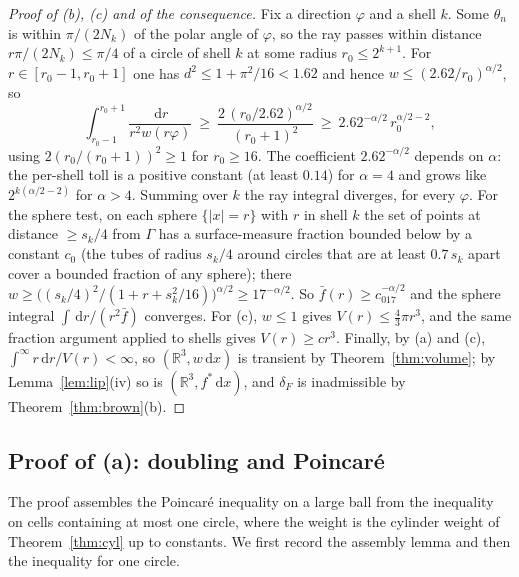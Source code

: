 \documentclass[11pt]{amsart}
\newcommand{\R}{\mathbb{R}}
\newcommand{\dd}{\,\mathrm{d}}
\newcommand{\abs}[1]{\lvert #1\rvert}
\newcommand{\fbar}{\bar f}
\theoremstyle{plain}
\theoremstyle{definition}
\theoremstyle{remark}
\begin{document}
\begin{proof}[Proof of (b), (c) and of the consequence]
Fix a direction $\varphi$ and a shell $k$. Some $\theta_n$ is within
$\pi/(2N_k)$ of the polar angle of $\varphi$, so the ray passes within
distance $r\pi/(2N_k)\le\pi/4$ of a circle of shell $k$ at some radius
$r_0\le2^{k+1}$. For $r\in[r_0-1,r_0+1]$ one has $d^2\le1+\pi^2/16<1.62$ and
hence $w\le(2.62/r_0)^{\alpha/2}$, so
\begin{equation}\label{eq:raybound}
\int_{r_0-1}^{r_0+1}\frac{\dd r}{r^2w(r\varphi)}\ \ge\
\frac{2\,(r_0/2.62)^{\alpha/2}}{(r_0+1)^2}\ \ge\ 2.62^{-\alpha/2}\,r_0^{\alpha/2-2},
\end{equation}
using $2(r_0/(r_0+1))^2\ge1$ for $r_0\ge16$. The coefficient $2.62^{-\alpha/2}$
depends on $\alpha$: the per-shell toll is a positive constant (at least $0.14$)
for $\alpha=4$ and grows like $2^{k(\alpha/2-2)}$ for
$\alpha>4$. Summing over $k$ the ray integral diverges, for every $\varphi$. For
the sphere test, on each sphere $\{\abs x=r\}$ with $r$ in shell $k$ the set of
points at distance $\ge s_k/4$ from $\Gamma$ has a surface-measure fraction
bounded below by a constant $c_0$ (the tubes of radius $s_k/4$ around circles
that are at least $0.7\,s_k$ apart cover a bounded fraction of any sphere);
there $w\ge\bigl((s_k/4)^2/(1+r+s_k^2/16)\bigr)^{\alpha/2}\ge17^{-\alpha/2}$.
So $\fbar(r)\ge c_017^{-\alpha/2}$ and the sphere integral $\int\dd r/(r^2\fbar)$
converges. For (c), $w\le1$ gives $V(r)\le\frac43\pi r^3$, and the same
fraction argument applied to shells gives $V(r)\ge cr^3$. Finally, by (a) and
(c), $\int^\infty r\dd r/V(r)<\infty$, so $(\R^3,w\dd x)$ is transient by
Theorem~\ref{thm:volume}; by Lemma~\ref{lem:lip}(iv) so is
$(\R^3,f^*\dd x)$, and $\delta_F$ is inadmissible by
Theorem~\ref{thm:brown}(b).
\end{proof}

\subsection{Proof of (a): doubling and Poincar\'e}
The proof assembles the Poincar\'e inequality on a large ball from the
inequality on cells containing at most one circle, where the weight is the
cylinder weight of Theorem~\ref{thm:cyl} up to constants. We first record the
assembly lemma and then the inequality for one circle.
\end{document}
